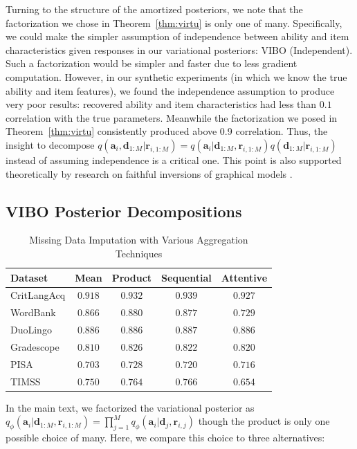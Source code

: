 Turning to the structure of the amortized posteriors, we note that the factorization we chose in Theorem~\ref{thm:virtu} is only one of many.
Specifically, we could make the simpler assumption of independence between ability and item characteristics given responses in our variational posteriors: VIBO (Independent).
Such a factorization would be simpler and faster due to less gradient computation.
However, in our synthetic experiments (in which we know the true ability and item features), we found the independence assumption to produce very poor results: recovered ability and item characteristics had less than $0.1$ correlation with the true parameters.
Meanwhile the factorization we posed in Theorem~\ref{thm:virtu} consistently produced above 0.9 correlation.
Thus, the insight to decompose $q(\mathbf{a}_i, \mathbf{d}_{1:M}|\mathbf{r}_{i,1:M}) = q(\mathbf{a}_i|\mathbf{d}_{1:M},\mathbf{r}_{i,1:M})q(\mathbf{d}_{1:M}|\mathbf{r}_{i,1:M})$ instead of assuming independence is a critical one.
This point is also supported theoretically by research on faithful inversions of graphical models \cite{webb2018faithful}.

\subsection{VIBO Posterior Decompositions}

\begin{table}[h!]
    \caption{Missing Data Imputation with Various Aggregation Techniques}
    \centering
    \begin{tabular}{lcccc}
    \hline
    Dataset & Mean & Product & Sequential & Attentive \\
    \hline
    CritLangAcq & $0.918$ & $0.932$ & $\mathbf{0.939}$ & $0.927$\\
    WordBank & $0.866$ & $\mathbf{0.880}$ & $0.877$ & $0.729$ \\
    DuoLingo & $0.886$ & $0.886$ & $\mathbf{0.887}$ & $0.886$ \\
    Gradescope & $0.810$ & $\mathbf{0.826}$ & $0.822$ & $0.820$\\
    PISA & $0.703$ & $\mathbf{0.728}$ & $0.720$ & $0.716$ \\
    TIMSS & $0.750$ & $0.764$ & $\mathbf{0.766}$ & $0.654$ \\
    \hline
    \end{tabular}
    \label{table:aggregation}
\end{table}

In the main text, we factorized the variational posterior as $q_\phi(\mathbf{a}_i|\mathbf{d}_{1:M},\mathbf{r}_{i,1:M}) = \prod_{j=1}^M q_\phi(\mathbf{a}_i|\mathbf{d}_j,\mathbf{r}_{i,j})$ though the product is only one possible choice of many. Here, we compare this choice to three alternatives:

